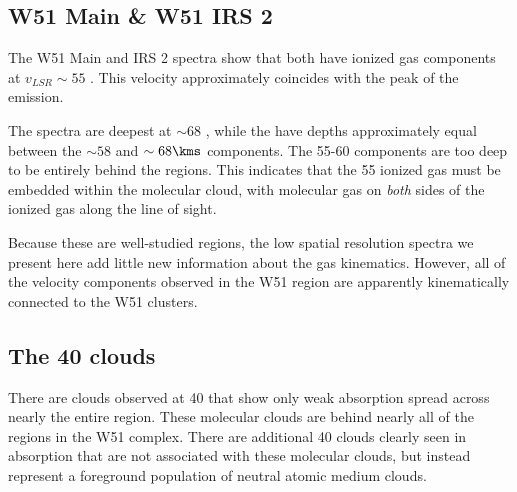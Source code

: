 \subsection{W51 Main \& W51 IRS 2}
The W51 Main and IRS 2 spectra show that both have ionized gas components at
$v_{LSR}\sim 55$ \kms.  This velocity approximately coincides with the peak of
the \thirteenco emission.

The \formaldehyde \oneone spectra are deepest at $\sim68$ \kms, while the
\twotwo have depths approximately equal between the $\sim58$ \kms and $\sim 68
\kms$ components.  The 55-60 \kms components are too deep to be entirely behind
the \hii regions.  This indicates that the 55 \kms ionized gas must be embedded
within the molecular cloud, with molecular gas on \emph{both} sides of the
ionized gas along the line of sight.

Because these are well-studied regions, the low spatial resolution
\formaldehyde spectra we present here add little new information about the gas
kinematics.  However, all of the velocity components observed in the W51 region
are apparently kinematically connected to the W51 clusters.

\subsection{The 40 \kms clouds}
There are clouds observed at 40 \kms that show only weak \formaldehyde
absorption spread across nearly the entire region.  These molecular clouds are
behind nearly all of the \hii regions in the W51 complex.  There are additional
40 \kms clouds clearly seen in \hi absorption \citep{Stil2006a} that are not
associated with these molecular clouds, but instead represent a foreground
population of neutral atomic medium clouds.



% 

